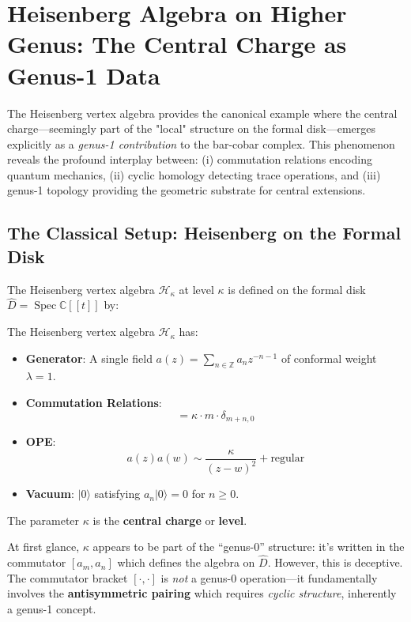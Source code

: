 \section{Heisenberg Algebra on Higher Genus: The Central Charge as Genus-1 Data}

The Heisenberg vertex algebra provides the canonical example where the central charge---seemingly part of the "local" structure on the formal disk---emerges explicitly as a \emph{genus-1 contribution} to the bar-cobar complex. This phenomenon reveals the profound interplay between: (i) commutation relations encoding quantum mechanics, (ii) cyclic homology detecting trace operations, and (iii) genus-1 topology providing the geometric substrate for central extensions.

\subsection{The Classical Setup: Heisenberg on the Formal Disk}

The Heisenberg vertex algebra $\mathcal{H}_\kappa$ at level $\kappa$ is defined on the formal disk $\hat{D} = \operatorname{Spec} \mathbb{C}[[t]]$ by:

\begin{definition}
The Heisenberg vertex algebra $\mathcal{H}_\kappa$ has:
\begin{itemize}
\item \textbf{Generator}: A single field $a(z) = \sum_{n \in \mathbb{Z}} a_n z^{-n-1}$ of conformal weight $\lambda = 1$.
\item \textbf{Commutation Relations}: 
\begin{equation}
[a_m, a_n] = \kappa \cdot m \cdot \delta_{m+n,0}
\end{equation}
\item \textbf{OPE}: 
\begin{equation}
a(z) a(w) \sim \frac{\kappa}{(z-w)^2} + \text{regular}
\end{equation}
\item \textbf{Vacuum}: $|0\rangle$ satisfying $a_n |0\rangle = 0$ for $n \geq 0$.
\end{itemize}
The parameter $\kappa$ is the \textbf{central charge} or \textbf{level}.
\end{definition}

\begin{remark}
At first glance, $\kappa$ appears to be part of the ``genus-0'' structure: it's written in the commutator $[a_m, a_n]$ which defines the algebra on $\hat{D}$. However, this is deceptive. The commutator bracket $[\cdot, \cdot]$ is \emph{not} a genus-0 operation---it fundamentally involves the \textbf{antisymmetric pairing} which requires \emph{cyclic structure}, inherently a genus-1 concept.
\end{remark}

